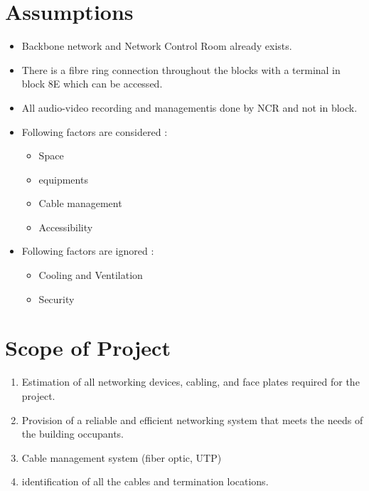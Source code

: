 \documentclass[12pt]{article}
\begin{document}
\section{Assumptions}
\begin{itemize}
    \item Backbone network and Network Control Room already exists.
    \item There is a fibre ring connection throughout the blocks with a terminal in block 8E which can be accessed.
    \item All audio-video recording and managementis done by NCR and not in block.
    \item Following factors are considered :
    \begin{itemize}
        \item Space
        \item equipments
        \item Cable management
        \item Accessibility
    \end{itemize} 
    \item Following factors are ignored : 
    \begin{itemize}
        \item Cooling and Ventilation
        \item Security
    \end{itemize}
\end{itemize}

\section{Scope of Project}
\begin{enumerate}
    \item Estimation of all networking devices, cabling, and face plates required for the project.
    \item Provision of a reliable and efficient networking system that meets the needs of the building occupants.
    \item Cable management system (fiber optic, UTP)
    \item identification of all the cables and termination locations.
\end{enumerate}
\end{document}
